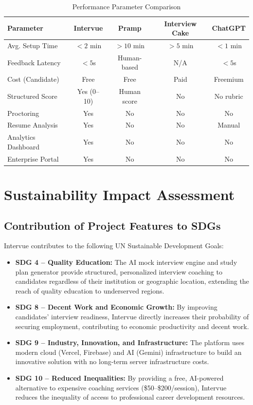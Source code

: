 \begin{table}[h!]
\centering
\caption{Performance Parameter Comparison}
\begin{tabular}{|p{4cm}|c|c|c|c|}
\hline
\textbf{Parameter} & \textbf{Intervue} & \textbf{Pramp} & \textbf{Interview Cake} & \textbf{ChatGPT} \\
\hline
Avg. Setup Time & $<2$ min & $>10$ min & $>5$ min & $<1$ min \\
\hline
Feedback Latency & $<5$s & Human-based & N/A & $<5$s \\
\hline
Cost (Candidate) & Free & Free & Paid & Freemium \\
\hline
Structured Score & Yes (0--10) & Human score & No & No rubric \\
\hline
Proctoring & Yes & No & No & No \\
\hline
Resume Analysis & Yes & No & No & Manual \\
\hline
Analytics Dashboard & Yes & No & No & No \\
\hline
Enterprise Portal & Yes & No & No & No \\
\hline
\end{tabular}
\end{table}

\section{Sustainability Impact Assessment}

\subsection{Contribution of Project Features to SDGs}
Intervue contributes to the following UN Sustainable Development Goals:
\begin{itemize}
	\item \textbf{SDG 4 -- Quality Education:} The AI mock interview engine and study plan generator provide structured, personalized interview coaching to candidates regardless of their institution or geographic location, extending the reach of quality education to underserved regions.
	\item \textbf{SDG 8 -- Decent Work and Economic Growth:} By improving candidates' interview readiness, Intervue directly increases their probability of securing employment, contributing to economic productivity and decent work.
	\item \textbf{SDG 9 -- Industry, Innovation, and Infrastructure:} The platform uses modern cloud (Vercel, Firebase) and AI (Gemini) infrastructure to build an innovative solution with no long-term server infrastructure costs.
	\item \textbf{SDG 10 -- Reduced Inequalities:} By providing a free, AI-powered alternative to expensive coaching services (\$50--\$200/session), Intervue reduces the inequality of access to professional career development resources.
\end{itemize}

